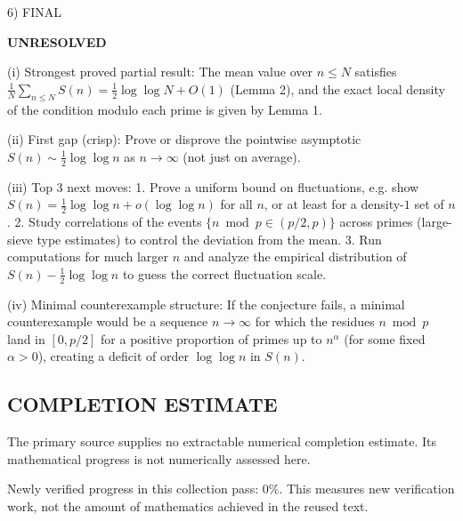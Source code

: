 6) FINAL

\textbf{UNRESOLVED}

(i) Strongest proved partial result: The mean value over $n\le N$ satisfies $\frac{1}{N}\sum_{n\le N}S(n)=\frac12\log\log N+O(1)$ (Lemma 2), and the exact local density of the condition modulo each prime is given by Lemma 1.

(ii) First gap (crisp): Prove or disprove the pointwise asymptotic $S(n)\sim \tfrac12\log\log n$ as $n\to\infty$ (not just on average).

(iii) Top 3 next moves:
  1. Prove a uniform bound on fluctuations, e.g. show $S(n)=\tfrac12\log\log n + o(\log\log n)$ for all $n$, or at least for a density-$1$ set of $n$.
  2. Study correlations of the events $\{n\bmod p\in(p/2,p)\}$ across primes (large-sieve type estimates) to control the deviation from the mean.
  3. Run computations for much larger $n$ and analyze the empirical distribution of $S(n)-\tfrac12\log\log n$ to guess the correct fluctuation scale.

(iv) Minimal counterexample structure: If the conjecture fails, a minimal counterexample would be a sequence $n\to\infty$ for which the residues $n\bmod p$ land in $[0,p/2]$ for a positive proportion of primes up to $n^\alpha$ (for some fixed $\alpha>0$), creating a deficit of order $\log\log n$ in $S(n)$.




\subsection*{COMPLETION ESTIMATE}
The primary source supplies no extractable numerical completion estimate. Its mathematical progress is not numerically assessed here.

Newly verified progress in this collection pass: $0\%$. This measures new verification work, not the amount of mathematics achieved in the reused text.
